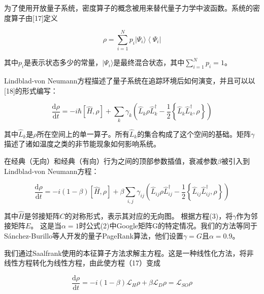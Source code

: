 为了使用开放量子系统，密度算子的概念被用来替代量子力学中波函数。系统的密度算子由[17]定义

\begin{equation}
	\rho = \sum _ { i = 1 } ^ { N } p _ { i } | \Psi _ { i } \rangle \left\langle \Psi _ { i } |\right.
\end{equation}

其中$p_i$是表示状态多少的常量，$| \Psi _ { i } \rangle$是最终混合状态，其中$\sum _ { i = 1 } ^ { N } p _ { i } = 1$。

Lindblad-von Neumann方程描述了量子系统在追踪环境后如何演变，并且可以以[18]的形式编写：

\begin{equation}
	\frac { \mathrm { d } \rho } { \mathrm { d } t } = - i \hbar [ \hat { H } , \rho ] + \sum _ { k } \gamma _ { k } \left( \hat { L } _ { k } \rho \hat { L } _ { k } ^ { \dagger } - \frac { 1 } { 2 } \left\{ \hat { L } _ { k } \hat { L } _ { k } ^ { \dagger } , \rho \right\} \right)
\end{equation}

其中$\hat{L}_k$是$\rho$所在空间上的单一算子。所有$\hat{L}_k$的集合构成了这个空间的基础。矩阵$\gamma$描述了诸如温度之类的非节能现象如何影响系统。

在经典（无向）和经典（有向）行为之间的顶部参数插值，衰减参数$\beta$被引入到Lindblad-von Neumann方程：

\begin{equation}
	\frac { \mathrm { d } \rho } { \mathrm { d } t } = - i ( 1 - \beta ) [ \hat { H } , \rho ] + \beta \sum _ { i , j } \gamma _ { i j } \left( \hat { L } _ { i j } \rho \hat { L } _ { i j } ^ { \dagger } - \frac { 1 } { 2 } \left\{ \hat { L } _ { i j } \hat { L } _ { i j } ^ { \dagger } , \rho \right\} \right)
\end{equation}

其中$\hat{H}$是邻接矩阵$C$的对称形式，表示其对应的无向图。 根据方程(3)，将$\gamma$作为邻接矩阵$E$。 这是当$\alpha=1$时公式(2)中Google矩阵G的特定情况。我们的方法等同于Sánchez-Burillo等人开发的量子PageRank算法，他们设置$\gamma = G$且$\alpha= 0.9$。

我们通过Saalfrank使用的本征算子方法求解主方程。这是一种线性化方法，将非线性方程转化为线性方程，由此使方程（17）变成

\begin{equation}
	\frac { \mathrm { d } \rho } { \mathrm { d } t } = - i ( 1 - \beta ) \mathcal { L } _ { H } \rho + \beta \mathcal { L } _ { D } \rho = \mathcal { L } _ { S O } \rho
\end{equation}

